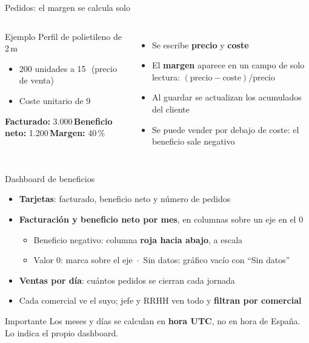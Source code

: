 \documentclass[aspectratio=169,11pt]{beamer}
\newcommand{\eur}{\texteuro}
\begin{document}
\begin{frame}{Pedidos: el margen se calcula solo}
  \begin{columns}[T]
    \begin{block}{Ejemplo}
      Perfil de polietileno de 2\,m
      \begin{itemize}
        \item 200 unidades a 15\,\eur\ (precio de venta)
        \item Coste unitario de 9\,\eur
      \end{itemize}
      \vspace{4pt}
      \textbf{Facturado:} 3.000\,\eur \quad \textbf{Beneficio neto:} 1.200\,\eur \quad \textbf{Margen:} 40\,\%
    \end{block}
    \begin{itemize}
      \item Se escribe \textbf{precio} y \textbf{coste}
      \item El \textbf{margen} aparece en un campo de solo lectura: $(\text{precio}-\text{coste})/\text{precio}$
      \item Al guardar se actualizan los acumulados del cliente
      \item Se puede vender por debajo de coste: el beneficio sale negativo
    \end{itemize}
  \end{columns}
\end{frame}

\begin{frame}{Dashboard de beneficios}
  \begin{itemize}
    \item \textbf{Tarjetas}: facturado, beneficio neto y n\'umero de pedidos
    \item \textbf{Facturaci\'on y beneficio neto por mes}, en columnas sobre un eje en el 0
    \begin{itemize}
      \item Beneficio negativo: columna \textcolor{no}{\textbf{roja hacia abajo}}, a escala
      \item Valor 0: marca sobre el eje \,$\cdot$\, Sin datos: gr\'afico vac\'io con ``Sin datos''
    \end{itemize}
    \item \textbf{Ventas por d\'ia}: cu\'antos pedidos se cierran cada jornada
    \item Cada comercial ve el suyo; jefe y RRHH ven todo y \textbf{filtran por comercial}
  \end{itemize}
  \vspace{6pt}
  \begin{block}{Importante}
    Los meses y d\'ias se calculan en \textbf{hora UTC}, no en hora de Espa\~na. Lo indica el propio dashboard.
  \end{block}
\end{frame}
\end{document}
